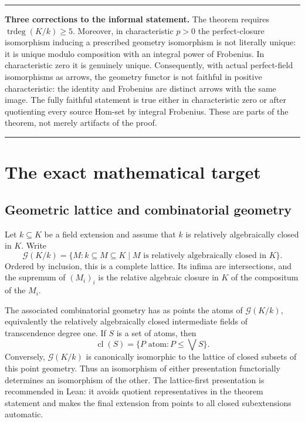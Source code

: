 \documentclass[11pt,oneside]{article}
\theoremstyle{definition}
\theoremstyle{remark}
\newcommand{\trdeg}{\operatorname{trdeg}}
\newcommand{\cl}{\operatorname{cl}}
\newcommand{\G}{\mathcal{G}}
\newenvironment{resultbox}
  {\par\medskip\begin{center}\begin{minipage}{0.94\linewidth}\color{leanblue}\hrule\medskip\color{black}}
  {\medskip\color{leanblue}\hrule\end{minipage}\end{center}\par\medskip}
\begin{document}
\begin{resultbox}
\textbf{Three corrections to the informal statement.}
The theorem requires $\trdeg(K/k)\geq 5$.  Moreover, in characteristic $p>0$ the
perfect-closure isomorphism inducing a prescribed geometry isomorphism is not literally
unique: it is unique modulo composition with an integral power of Frobenius.  In
characteristic zero it is genuinely unique.  Consequently, with actual perfect-field
isomorphisms as arrows, the geometry functor is not faithful in positive characteristic:
the identity and Frobenius are distinct arrows with the same image.  The fully faithful
statement is true either in characteristic zero or after quotienting every source Hom-set
by integral Frobenius.  These are parts of the theorem, not merely artifacts of the proof.
\end{resultbox}

\tableofcontents
\newpage

\section{The exact mathematical target}

\subsection{Geometric lattice and combinatorial geometry}

Let $k\subseteq K$ be a field extension and assume that $k$ is relatively algebraically
closed in $K$.  Write
\[
  \G(K/k)=\{M: k\subseteq M\subseteq K\mid M\text{ is relatively algebraically closed in }K\}.
\]
Ordered by inclusion, this is a complete lattice.  Its infima are intersections, and the
supremum of $(M_i)_i$ is the relative algebraic closure in $K$ of the compositum of the
$M_i$.

The associated combinatorial geometry has as points the atoms of $\G(K/k)$, equivalently
the relatively algebraically closed intermediate fields of transcendence degree one.  If
$S$ is a set of atoms, then
\[
  \cl(S)=\{P\text{ atom}:P\leq \bigvee S\}.
\]
Conversely, $\G(K/k)$ is canonically isomorphic to the lattice of closed subsets of this
point geometry.  Thus an isomorphism of either presentation functorially determines an
isomorphism of the other.  The lattice-first presentation is recommended in Lean: it
avoids quotient representatives in the theorem statement and makes the final extension
from points to all closed subextensions automatic.
\end{document}
